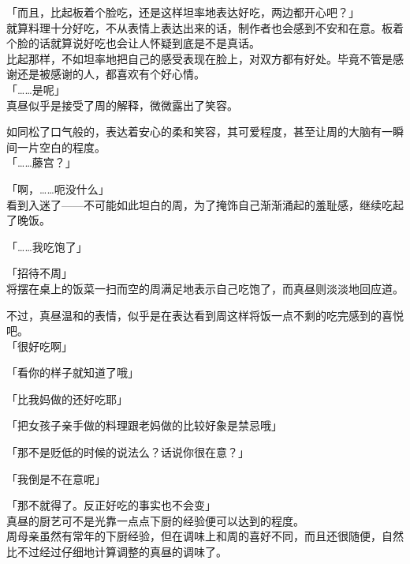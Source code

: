 「而且，比起板着个脸吃，还是这样坦率地表达好吃，两边都开心吧？」\\

就算料理十分好吃，不从表情上表达出来的话，制作者也会感到不安和在意。板着个脸的话就算说好吃也会让人怀疑到底是不是真话。\\

比起那样，不如坦率地把自己的感受表现在脸上，对双方都有好处。毕竟不管是感谢还是被感谢的人，都喜欢有个好心情。\\

「……是呢」\\

真昼似乎是接受了周的解释，微微露出了笑容。

如同松了口气般的，表达着安心的柔和笑容，其可爱程度，甚至让周的大脑有一瞬间一片空白的程度。\\

「……藤宫？」

「啊，……呃没什么」\\

看到入迷了——不可能如此坦白的周，为了掩饰自己渐渐涌起的羞耻感，继续吃起了晚饭。\\

\vspace{2\baselineskip}

「……我吃饱了」

「招待不周」\\

将摆在桌上的饭菜一扫而空的周满足地表示自己吃饱了，而真昼则淡淡地回应道。

不过，真昼温和的表情，似乎是在表达看到周这样将饭一点不剩的吃完感到的喜悦吧。\\

「很好吃啊」

「看你的样子就知道了哦」

「比我妈做的还好吃耶」

「把女孩子亲手做的料理跟老妈做的比较好象是禁忌哦」

「那不是贬低的时候的说法么？话说你很在意？」

「我倒是不在意呢」

「那不就得了。反正好吃的事实也不会变」\\

真昼的厨艺可不是光靠一点点下厨的经验便可以达到的程度。\\

周母亲虽然有常年的下厨经验，但在调味上和周的喜好不同，而且还很随便，自然比不过经过仔细地计算调整的真昼的调味了。\\

